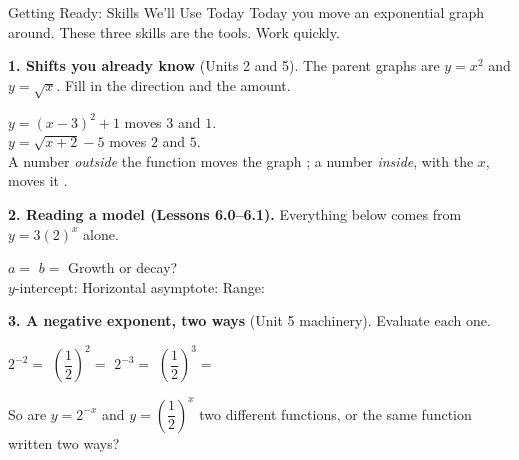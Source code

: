 \documentclass[10pt]{article}
\begin{document}
\namedateperiod

\vspace{0.10in}

\begin{notesbox}{Getting Ready: Skills We'll Use Today}
\small Today you move an exponential graph around. These three skills are the tools. Work quickly.

\vspace{4pt}
\textbf{1. Shifts you already know} (Units 2 and 5). The parent graphs are $y=x^{2}$ and
$y=\sqrt{x}$. Fill in the direction and the amount.

\vspace{3pt}
\hspace*{1.2em} $y=(x-3)^{2}+1$ \; moves  $3$ \; and  $1$. \\[3pt]
\hspace*{1.2em} $y=\sqrt{x+2}-5$ \; moves  $2$ \; and  $5$. \\[3pt]
\hspace*{1.2em} A number \emph{outside} the function moves the graph ; a number
\emph{inside}, with the $x$, moves it .

\vspace{6pt}
\textbf{2. Reading a model (Lessons 6.0--6.1).} Everything below comes from $y=3(2)^{x}$ alone.

\vspace{3pt}
\hspace*{1.2em} $a=$  \quad $b=$  \quad Growth or decay?
 \\[4pt]
\hspace*{1.2em} $y$-intercept:  \quad Horizontal asymptote:  \quad
Range: 

\vspace{6pt}
\textbf{3. A negative exponent, two ways} (Unit 5 machinery). Evaluate each one.

\vspace{3pt}
\hspace*{1.2em} $2^{-2}=$  \qquad $\left(\dfrac{1}{2}\right)^{2}=$ 
\qquad $2^{-3}=$  \qquad $\left(\dfrac{1}{2}\right)^{3}=$ 

\vspace{4pt}
\hspace*{1.2em} So are $y=2^{-x}$ and $y=\left(\dfrac{1}{2}\right)^{x}$ two different functions, or
the same function written two ways? 

\end{notesbox}
\end{document}
